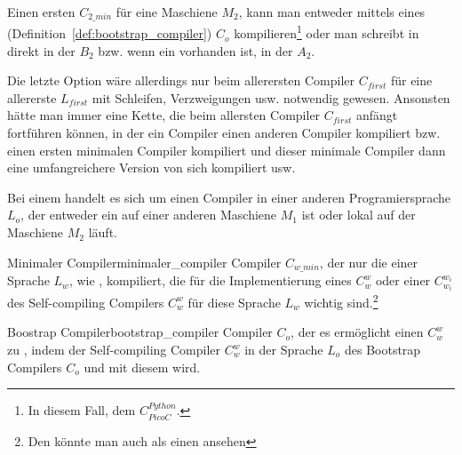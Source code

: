 \begin{Special_Paragraph}
  Einen ersten  $C_{2\_min}$ für eine Maschiene $M_2$, kann man entweder mittels eines   (Definition~\ref{def:bootstrap_compiler}) $C_o$ kompilieren\footnote{In diesem Fall, dem  $C_{PicoC}^{Python}$.} oder man schreibt in direkt in der  $B_2$ bzw. wenn ein  vorhanden ist, in der  $A_2$.

  Die letzte Option wäre allerdings nur beim allerersten Compiler $C_{first}$ für eine allererste  $L_{first}$ mit Schleifen, Verzweigungen usw. notwendig gewesen. Ansonsten hätte man immer eine Kette, die beim allersten Compiler $C_{first}$ anfängt fortführen können, in der ein Compiler einen anderen Compiler kompiliert bzw. einen ersten minimalen Compiler kompiliert und dieser minimale Compiler dann eine umfangreichere Version von sich kompiliert usw.

  Bei einem  handelt es sich um einen Compiler in einer anderen Programiersprache $L_o$, der entweder ein  auf einer anderen Maschiene $M_1$ ist oder lokal auf der Maschiene $M_2$ läuft.
\end{Special_Paragraph}

\begin{Definition}{Minimaler Compiler}{minimaler_compiler}
  Compiler $C_{w\_min}$, der nur die  einer Sprache $L_w$, wie ,   kompiliert, die für die Implementierung eines  $C_{w}^{w}$ oder einer  $C_{w_i}^{w_i}$ des Self-compiling Compilers $C_w^w$ für diese Sprache $L_w$ wichtig sind.\footnote{Den  könnte man auch als einen  ansehen}
\end{Definition}{}{}

\begin{Definition}{Boostrap Compiler}{bootstrap_compiler}
  Compiler $C_o$, der es ermöglicht einen  $C_w^w$ zu , indem der Self-compiling Compiler $C_w^w$ in der Sprache $L_o$ des Bootstrap Compilers $C_o$  und mit diesem  wird.

  \setcounter{defcounter}{\value{\tcbcounter}}
\end{Definition}

